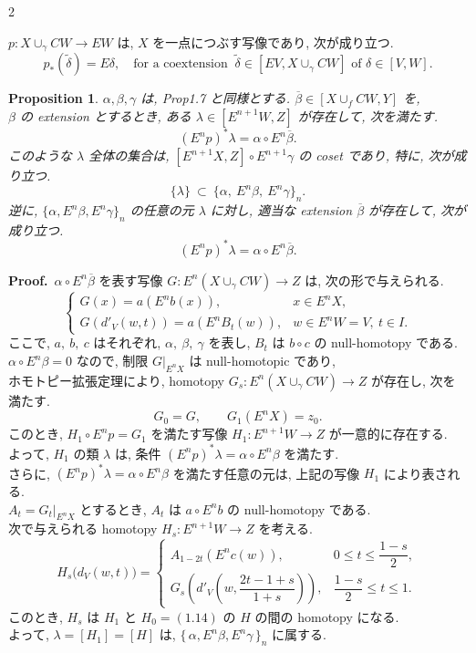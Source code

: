 \documentclass[10pt, leqno]{ltjsarticle}
\newcommand{\Ex}{E}        %
\newcommand{\todai}[2][]{\{\,#2\,\}_{#1}}      %
\numberwithin{equation}{section}
\theoremstyle{plain}
\newtheorem{proposition}[theorem]{Proposition}
\theoremstyle{definition}
\theoremstyle{remark}
\begin{document}
\begin{paracol}{2}

\(p:X\cup_\gamma CW\to EW\) は,
\(X\) を一点につぶす写像であり, 次が成り立つ.
\begin{equation}\label{eq:p-star}
p_*(\widetilde{\delta})=E\delta,
\quad\text{for a coextension }\ 
\widetilde{\delta}\in[EV, X\cup_\gamma CW]
\text{ of }\delta\in[V, W].
\end{equation}

\begin{proposition}\label{prop:1-9}
$\alpha,\beta,\gamma$ は, \textnormal{Prop1.7} と同様とする. 
$\overline\beta\in[X\cup_f CW, Y]$ を,\\
$\beta$ の \emph{extension} とするとき,
ある $\lambda\in[\Ex^{n+1}W, Z]$ が存在して, 次を満たす.
\[
(\Ex^n p)^*\lambda=\alpha\circ \Ex^n\overline\beta.
\]
このような $\lambda$ 全体の集合は,
\(
[\Ex^{n+1}X, Z]\circ \Ex^{n+1}\gamma
\)
の coset であり, 特に, 次が成り立つ.
\[
\{\lambda\}\ \subset\ \{\alpha,\ \Ex^n\beta,\ \Ex^n\gamma\}_n .
\]
逆に, $\{\alpha,\Ex^n\beta,\Ex^n\gamma\}_n$ の任意の元 $\lambda$ に対し, 
適当な extension $\overline\beta$ が存在して,
次が成り立つ.
\[
(\Ex^n p)^*\lambda=\alpha\circ \Ex^n\overline\beta.
\]
\end{proposition}

\noindent
\textbf{Proof.}\
\(\alpha\circ E^n\overline{\beta}\) を表す写像 
\(G:E^n(X\cup_\gamma CW)\to Z\) は,
次の形で与えられる.
\[
\begin{cases}
  G(x) = a(E^n b(x)), & x \in E^n X,\\
  G(d'_V(w, t)) = a(E^n B_t(w)), & w \in E^n W = V,\ t \in I.
\end{cases}
\]
ここで,
\(a,\ b,\ c\) はそれぞれ, \(\alpha,\ \beta,\ \gamma\) を表し,
\(B_t\) は \(b\circ c\) の null-homotopy である.\\
\(\alpha\circ E^n\beta = 0\) なので,
制限 \(G|_{E^n X}\) は null-homotopic であり,\\
ホモトピー拡張定理により, 
homotopy \(G_s:E^n(X\cup_\gamma CW) \to Z\)
が存在し, 次を満たす.
\[
G_0 = G,\qquad 
G_1(E^n X) = z_0.
\]
このとき,
\(H_1\circ E^n p = G_1\) を満たす写像 
\(H_1 : E^{n+1}W \to Z\)
が一意的に存在する.\\
よって,
\(H_1\) の類 \(\lambda\) は, 
条件 \((E^n p)^*\lambda = \alpha\circ E^n\beta\)
を満たす.\\
さらに, 
\((E^n p)^*\lambda = \alpha\circ E^n\beta\)
を満たす任意の元は, 
上記の写像 \(H_1\) により表される.\\
\(A_t = G_t|_{E^n X}\) とするとき,
\(A_t\) は \(a\circ E^n b\) の null-homotopy である.\\
次で与えられる homotopy 
$H_s:E^{n+1}W\to Z$ を考える.
\[
H_s\bigl(d_V(w,t)\bigr)=
\begin{cases}
A_{1-2t}\!\left(E^n c(w)\right), 
& 0\le t\le \dfrac{1-s}{2},\\
G_s\!\left(d'_V\!\left(w,\dfrac{2t-1+s}{1+s}\right)\right), 
& \dfrac{1-s}{2}\le t\le 1.
\end{cases}
\]
このとき, 
$H_s$ は $H_1$ と $H_0= (1.14) \text{ の }H$ の間の homotopy になる. \\
よって,
\(\lambda = [H_1] = [H]\) は,
\(\todai[n]{\alpha,\Ex^n\beta,\Ex^n\gamma}\) に属する.


\end{paracol}
\end{document}
